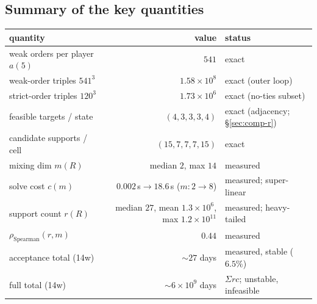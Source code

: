 \documentclass[11pt]{article}
\begin{document}
\subsection{Summary of the key quantities}
\label{app:summary}
\begin{center}
\begin{tabular}{lrl}
\toprule
quantity & value & status\\
\midrule
weak orders per player $a(5)$ & $541$ & exact\\
weak-order triples $541^3$ & $1.58\times10^8$ & exact (outer loop)\\
strict-order triples $120^3$ & $1.73\times10^6$ & exact (no-ties subset)\\
feasible targets / state & $(4,3,3,3,4)$ & exact (adjacency; \S\ref{sec:comp-r})\\
candidate supports / cell & $(15,7,7,7,15)$ & exact\\
mixing dim $m(R)$ & median $2$, max $14$ & measured\\
solve cost $c(m)$ & $0.002$\,s$\to$$18.6$\,s ($m{:}2{\to}8$) & measured; super-linear\\
support count $r(R)$ & median $27$, mean $1.3\times10^6$, max $1.2\times10^{11}$ & measured; heavy-tailed\\
$\rho_{\text{Spearman}}(r,m)$ & $0.44$ & measured\\
acceptance total (14w) & $\sim27$ days & measured, stable ($6.5\%$)\\
full total (14w) & $\sim6\times10^9$ days & $\Sigma r c$; unstable, infeasible\\
\bottomrule
\end{tabular}
\end{center}
\end{document}
